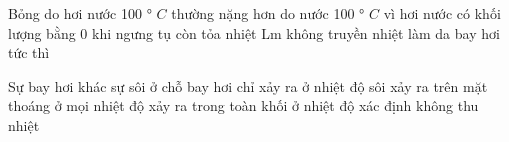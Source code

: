 \begin{ex}
Bỏng do hơi nước 100 ° $C$ thường nặng hơn do nước 100 ° $C$ vì hơi nước
\choice
{có khối lượng bằng 0}
{\True khi ngưng tụ còn tỏa nhiệt Lm}
{không truyền nhiệt}
{làm da bay hơi tức thì}
\end{ex}

\begin{ex}
Sự bay hơi khác sự sôi ở chỗ bay hơi
\choice
{chỉ xảy ra ở nhiệt độ sôi}
{\True xảy ra trên mặt thoáng ở mọi nhiệt độ}
{xảy ra trong toàn khối ở nhiệt độ xác định}
{không thu nhiệt}
\end{ex}
